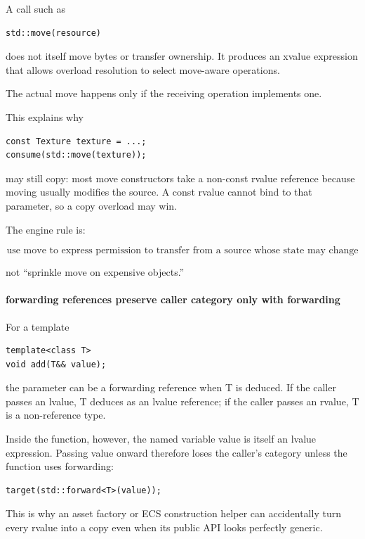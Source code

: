 A call such as

\begin{verbatim}
std::move(resource)
\end{verbatim}

does not itself move bytes or transfer ownership. It produces an xvalue expression that allows overload resolution to select move-aware operations.

The actual move happens only if the receiving operation implements one.

This explains why

\begin{verbatim}
const Texture texture = ...;
consume(std::move(texture));
\end{verbatim}

may still copy: most move constructors take a non-const rvalue reference because moving usually modifies the source. A const rvalue cannot bind to that parameter, so a copy overload may win.

The engine rule is:

\[
\boxed{
\text{use move to express permission to transfer from a source whose state may change}
}
\]

not ``sprinkle move on expensive objects.''

\paragraph{forwarding references preserve caller category only with forwarding}\label{forwarding-references-preserve-caller-category-only-with-forwarding}

For a template

\begin{verbatim}
template<class T>
void add(T&& value);
\end{verbatim}

the parameter can be a forwarding reference when T is deduced. If the caller passes an lvalue, T deduces as an lvalue reference; if the caller passes an rvalue, T is a non-reference type.

Inside the function, however, the named variable value is itself an lvalue expression. Passing value onward therefore loses the caller's category unless the function uses forwarding:

\begin{verbatim}
target(std::forward<T>(value));
\end{verbatim}

This is why an asset factory or ECS construction helper can accidentally turn every rvalue into a copy even when its public API looks perfectly generic.

